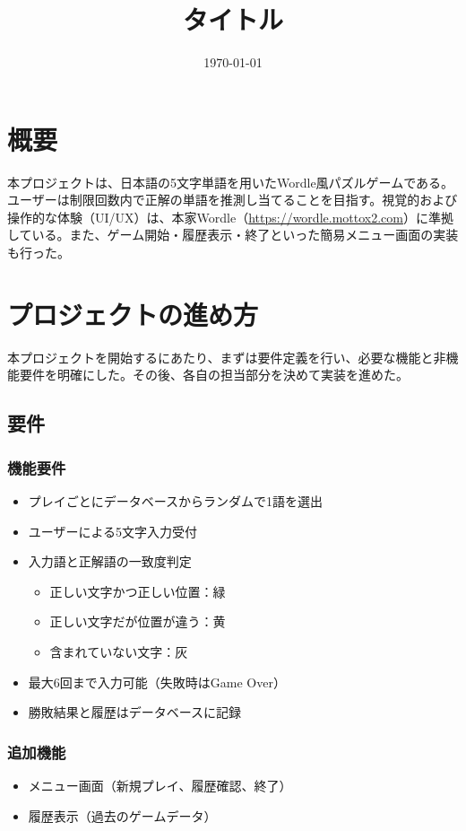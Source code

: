 \documentclass[a4j]{ujarticle}
\title{タイトル}
\date{\today}
\author{}
\begin{document}
\maketitle
\section{概要}
本プロジェクトは、日本語の5文字単語を用いたWordle風パズルゲームである。ユーザーは制限回数内で正解の単語を推測し当てることを目指す。視覚的および操作的な体験（UI/UX）は、本家Wordle（\url{https://wordle.mottox2.com}）に準拠している。また、ゲーム開始・履歴表示・終了といった簡易メニュー画面の実装も行った。
\section{プロジェクトの進め方}
本プロジェクトを開始するにあたり、まずは要件定義を行い、必要な機能と非機能要件を明確にした。その後、各自の担当部分を決めて実装を進めた。
\subsection{要件}
\subsubsection{機能要件}
\begin{itemize}
  \item プレイごとにデータベースからランダムで1語を選出
  \item ユーザーによる5文字入力受付
  \item 入力語と正解語の一致度判定
  \begin{itemize}
    \item 正しい文字かつ正しい位置：緑
    \item 正しい文字だが位置が違う：黄
    \item 含まれていない文字：灰
  \end{itemize}
  \item 最大6回まで入力可能（失敗時はGame Over）
  \item 勝敗結果と履歴はデータベースに記録
\end{itemize}

\subsubsection{追加機能}
\begin{itemize}
  \item メニュー画面（新規プレイ、履歴確認、終了）
  \item 履歴表示（過去のゲームデータ）
\end{itemize}
\end{document}
